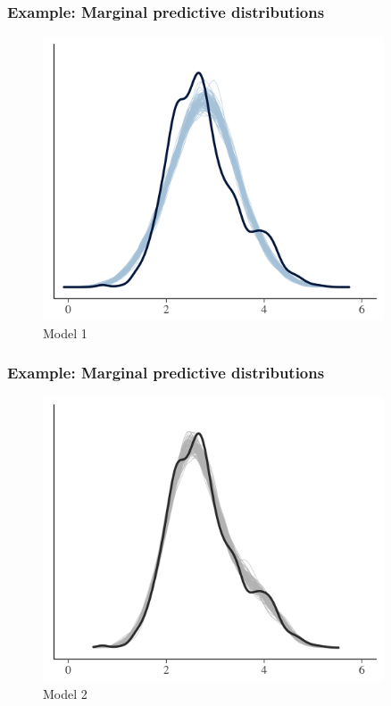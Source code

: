 \documentclass[10pt]{beamer}
\begin{document}
\begin{frame}

\frametitle{Example: Marginal predictive distributions}

\begin{figure}
\centering
\includegraphics[width=0.9\textwidth]{figs/ppc_dens1.png}
\caption{Model 1}
\end{figure}

\end{frame}

\begin{frame}
\frametitle{Example: Marginal predictive distributions}

\begin{figure}
\centering
\includegraphics[width=0.9\textwidth]{figs/ppc_dens2.png}
\caption{Model 2}
\end{figure}

\end{frame}
\end{document}
